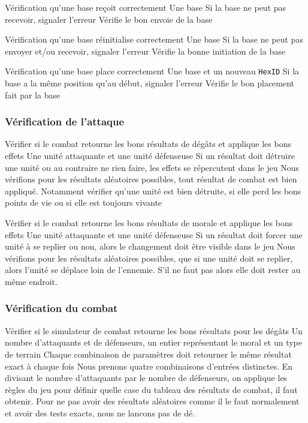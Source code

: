 \mytest
{Vérification qu'une base reçoit correctement}
{Une base}
{Si la base ne peut pas recevoir,  signaler l'erreur }
{Vérifie le bon envoie de la base }

\mytest
{Vérification qu'une base réinitialise correctement}
{Une base}
{Si la base ne peut pas envoyer et/ou recevoir,  signaler l'erreur }
{Vérifie la bonne initiation de la base }

\mytest
{Vérification qu'une base place correctement}
{Une base et un nouveau {\tt HexID}}
{Si la base a la même position qu'au début,  signaler l'erreur }
{Vérifie le bon placement fait par la  base }

\subsubsection{Vérification de l'attaque}

\mytest
{Vérifier si le combat retourne les bons résultats de dégâts et applique les bons effets}
{Une unité attaquante et une unité défenseuse}
{Si un résultat doit détruire une unité ou au contraire ne rien faire, les effets se répercutent dans le jeu}
{Nous vérifions pour les résultats aléatoires possibles, tout résultat de combat est bien appliqué. Notamment vérifier
    qu'une unité est bien détruite, si elle perd les bons points de vie ou si elle est toujours vivante}

\mytest
{Vérifier si le combat retourne les bons résultats de morale et applique les bons effets}
{Une unité attaquante et une unité défenseuse}
{Si un résultat doit forcer une unité à se replier ou non, alors le changement doit être visible dans le jeu}
{Nous vérifions pour les résultats aléatoires possibles, que si une unité doit se replier, alors l'unité se
    déplace loin de l'ennemie. S'il ne faut pas alors elle doit rester au même endroit.}

\subsubsection{Vérification du combat}

\mytest
{Vérifier si le simulateur de combat retourne les bons résultats pour les dégâts}
{Un nombre d'attaquants et de défenseurs, un entier représentant le moral et un type de terrain}
{Chaque combinaison de paramètres doit retourner le même résultat exact à chaque fois}
{Nous prenons quatre combinaisons d'entrées distinctes.
    En divisant le nombre d'attaquants par le nombre de défenseurs, on applique les règles du jeu pour définir
    quelle case du tableau des résultats de combat, il faut obtenir. Pour ne pas avoir des résultats aléatoires comme
    il le faut normalement et avoir des tests exacts, nous ne lancons pas de dé.}

